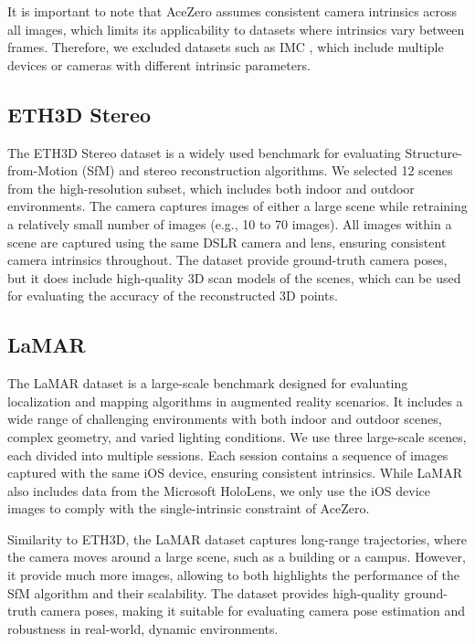 It is important to note that AceZero assumes consistent camera intrinsics across all images, which limits its applicability to datasets where intrinsics vary between frames.
Therefore, we excluded datasets such as IMC \cite{Jin2020}, which include multiple devices or cameras with different intrinsic parameters.

\subsection{ETH3D Stereo}
The ETH3D Stereo dataset \cite{schoeps2017cvpr} is a widely used benchmark for evaluating Structure-from-Motion (SfM) and stereo reconstruction algorithms. 
We selected 12 scenes from the high-resolution subset, which includes both indoor and outdoor environments. 
The camera captures images of either a large scene while retraining a relatively small number of images (e.g., 10 to 70 images).
All images within a scene are captured using the same DSLR camera and lens, ensuring consistent camera intrinsics throughout. 
The dataset provide ground-truth camera poses, but it does include high-quality 3D scan models of the scenes, which can be used for evaluating the accuracy of the reconstructed 3D points.

\subsection{LaMAR}
The LaMAR dataset \cite{sarlin2022lamar} is a large-scale benchmark designed for evaluating localization and mapping algorithms in augmented reality scenarios.
It includes a wide range of challenging environments with both indoor and outdoor scenes, complex geometry, and varied lighting conditions.
We use three large-scale scenes, each divided into multiple sessions. Each session contains a sequence of images captured with the same iOS device, ensuring consistent intrinsics.
While LaMAR also includes data from the Microsoft HoloLens, we only use the iOS device images to comply with the single-intrinsic constraint of AceZero. 

Similarity to ETH3D, the LaMAR dataset captures long-range trajectories, where the camera moves around a large scene, such as a building or a campus. 
However, it provide much more images, allowing to both highlights the performance of the SfM algorithm and their scalability.
The dataset provides high-quality ground-truth camera poses, making it suitable for evaluating camera pose estimation and robustness in real-world, dynamic environments.


